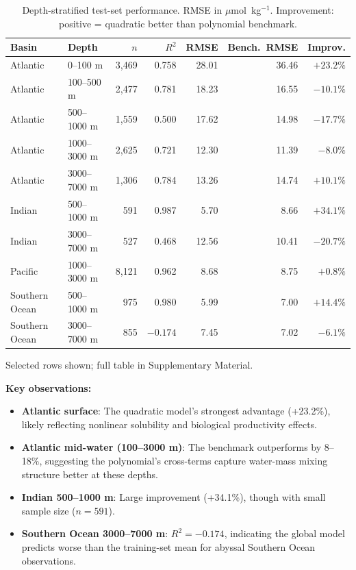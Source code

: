 \documentclass[12pt,a4paper]{article}
\begin{document}
\begin{table}[htbp]
\centering
\caption{Depth-stratified test-set performance. RMSE in $\mu$mol~kg$^{-1}$. Improvement: positive = quadratic better than polynomial benchmark.}
\label{tab:depth}
\small
\begin{tabular}{ll r rrr r}
\toprule
\textbf{Basin} & \textbf{Depth} & $n$ & $R^2$ & RMSE & Bench.\ RMSE & \textbf{Improv.} \\
\midrule
Atlantic & 0--100 m      & 3{,}469  & 0.758 & 28.01 & 36.46 & $+23.2\%$ \\
Atlantic & 100--500 m    & 2{,}477  & 0.781 & 18.23 & 16.55 & $-10.1\%$ \\
Atlantic & 500--1000 m   & 1{,}559  & 0.500 & 17.62 & 14.98 & $-17.7\%$ \\
Atlantic & 1000--3000 m  & 2{,}625  & 0.721 & 12.30 & 11.39 & $-8.0\%$ \\
Atlantic & 3000--7000 m  & 1{,}306  & 0.784 & 13.26 & 14.74 & $+10.1\%$ \\
\midrule
Indian & 500--1000 m    & 591    & 0.987 & 5.70  & 8.66  & $+34.1\%$ \\
Indian & 3000--7000 m   & 527    & 0.468 & 12.56 & 10.41 & $-20.7\%$ \\
\midrule
Pacific & 1000--3000 m  & 8{,}121 & 0.962 & 8.68  & 8.75  & $+0.8\%$ \\
\midrule
Southern Ocean & 500--1000 m   & 975    & 0.980 & 5.99  & 7.00  & $+14.4\%$ \\
Southern Ocean & 3000--7000 m  & 855    & $-0.174$ & 7.45 & 7.02 & $-6.1\%$ \\
\bottomrule
\end{tabular}
\par\medskip
\footnotesize{Selected rows shown; full table in Supplementary Material.}
\end{table}

\textbf{Key observations:}
\begin{itemize}[nosep]
    \item \textbf{Atlantic surface}: The quadratic model's strongest advantage (+23.2\%), likely reflecting nonlinear solubility and biological productivity effects.
    \item \textbf{Atlantic mid-water (100--3000 m)}: The benchmark outperforms by 8--18\%, suggesting the polynomial's cross-terms capture water-mass mixing structure better at these depths.
    \item \textbf{Indian 500--1000 m}: Large improvement (+34.1\%), though with small sample size ($n = 591$).
    \item \textbf{Southern Ocean 3000--7000 m}: $R^2 = -0.174$, indicating the global model predicts worse than the training-set mean for abyssal Southern Ocean observations.
\end{itemize}
\end{document}
